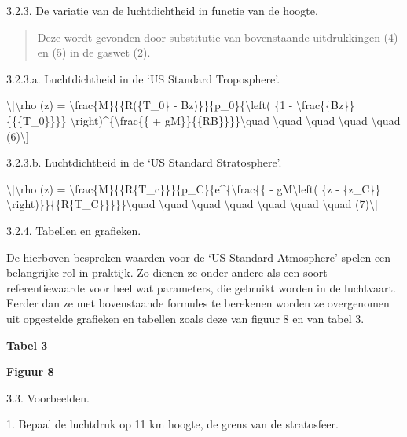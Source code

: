 \documentclass[]{article}
\begin{document}
3.2.3. De variatie van de luchtdichtheid in functie van de hoogte.

\begin{quote}
Deze wordt gevonden door substitutie van bovenstaande uitdrukkingen (4)
en (5) in de gaswet (2).
\end{quote}

3.2.3.a. Luchtdichtheid in de `US Standard Troposphere'.

\textbackslash{}{[}\textbackslash{}rho (z) =
\textbackslash{}frac\{M\}\{\{R(\{T\_0\} -
Bz)\}\}\{p\_0\}\{\textbackslash{}left( \{1 -
\textbackslash{}frac\{\{Bz\}\}\{\{\{T\_0\}\}\}\}
\textbackslash{}right)\^{}\{\textbackslash{}frac\{\{ +
gM\}\}\{\{RB\}\}\}\}\textbackslash{}quad \textbackslash{}quad
\textbackslash{}quad \textbackslash{}quad \textbackslash{}quad
(6)\textbackslash{}{]}

3.2.3.b. Luchtdichtheid in de `US Standard Stratosphere'.

\textbackslash{}{[}\textbackslash{}rho (z) =
\textbackslash{}frac\{M\}\{\{R\{T\_c\}\}\}\{p\_C\}\{e\^{}\{\textbackslash{}frac\{\{
- gM\textbackslash{}left( \{z - \{z\_C\}\}
\textbackslash{}right)\}\}\{\{R\{T\_C\}\}\}\}\}\textbackslash{}quad
\textbackslash{}quad \textbackslash{}quad \textbackslash{}quad
\textbackslash{}quad \textbackslash{}quad \textbackslash{}quad
(7)\textbackslash{}{]}

3.2.4. Tabellen en grafieken.

De hierboven besproken waarden voor de `US Standard Atmosphere' spelen
een belangrijke rol in praktijk. Zo dienen ze onder andere als een soort
referentiewaarde voor heel wat parameters, die gebruikt worden in de
luchtvaart. Eerder dan ze met bovenstaande formules te berekenen worden
ze overgenomen uit opgestelde grafieken en tabellen zoals deze van
figuur 8 en van tabel 3.

\textbf{Tabel 3}

\textbf{Figuur 8 }

3.3. Voorbeelden.

1. Bepaal de luchtdruk op 11 km hoogte, de grens van de stratosfeer.
\end{document}
